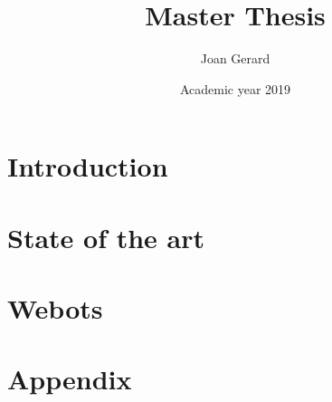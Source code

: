 \documentclass[12pt,twoside]{report}
\title{Master Thesis}
\author{Joan Gerard}
\date{Academic year 2019}
\begin{document}


%

\tableofcontents

\listoffigures

\listoftables

\chapter{Introduction}



\chapter{State of the art}


\chapter{Webots}


%

%

%

\appendix
\chapter{Appendix}


\printbibliography
\end{document}
